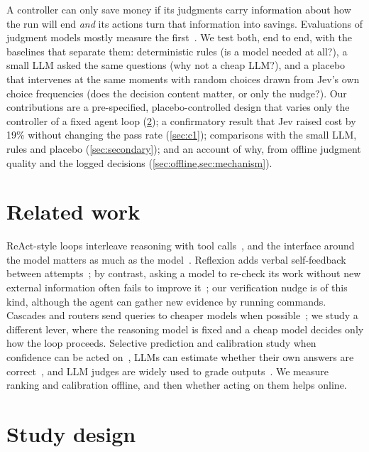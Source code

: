 \documentclass[10pt]{article}
\begin{document}
A controller can only save money if its judgments carry information about how the run will end \emph{and} its actions turn that information into savings.
Evaluations of judgment models mostly measure the first~\citep{zheng2023judging,kadavath2022know}.
We test both, end to end, with the baselines that separate them: deterministic rules (is a model needed at all?), a small LLM asked the same questions (why not a cheap LLM?), and a placebo that intervenes at the same moments with random choices drawn from Jev's own choice frequencies (does the decision content matter, or only the nudge?).
Our contributions are a pre-specified, placebo-controlled design that varies only the controller of a fixed agent loop (\cref{sec:design}); a confirmatory result that Jev raised cost by 19\% without changing the pass rate (\cref{sec:c1}); comparisons with the small LLM, rules and placebo (\cref{sec:secondary}); and an account of why, from offline judgment quality and the logged decisions (\cref{sec:offline,sec:mechanism}).

\section{Related work}

ReAct-style loops interleave reasoning with tool calls~\citep{yao2023react}, and the interface around the model matters as much as the model~\citep{yang2024sweagent}.
Reflexion adds verbal self-feedback between attempts~\citep{shinn2023reflexion}; by contrast, asking a model to re-check its work without new external information often fails to improve it~\citep{huang2024selfcorrect}; our verification nudge is of this kind, although the agent can gather new evidence by running commands.
Cascades and routers send queries to cheaper models when possible~\citep{chen2023frugalgpt,ong2024routellm}; we study a different lever, where the reasoning model is fixed and a cheap model decides only how the loop proceeds.
Selective prediction and calibration study when confidence can be acted on~\citep{geifman2017selective,guo2017calibration}, LLMs can estimate whether their own answers are correct~\citep{kadavath2022know}, and LLM judges are widely used to grade outputs~\citep{zheng2023judging}.
We measure ranking and calibration offline, and then whether acting on them helps online.

\section{Study design}
\label{sec:design}
\end{document}
